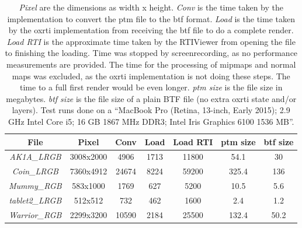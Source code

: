 \begin{table}[H]
\begin{tabular}{|c | c c c c c c|}
 \hline
 File & Pixel & Conv & Load & Load RTI &
 ptm size & btf size\\
  \hline
  \emph{AK1A\_LRGB} & 3008x2000 & 4906 & 1713 & 11800 & 54.1 & 30  \\
  \emph{Coin\_LRGB} & 7360x4912 & 24674 & 8224 & 59200 & 325.4 & 136  \\
  \emph{Mummy\_RGB} & 583x1000 & 1769 & 627 & 5200 & 10.5 & 5.6  \\
  \emph{tablet2\_LRGB} & 512x512 & 732 & 462 & 1600 & 2.4 & 1.2  \\
  \emph{Warrior\_RGB} & 2299x3200 & 10590 & 2184 & 25500 & 132.4 & 50.2  \\
 \hline
\end{tabular}
\caption[Performance Comparison]{\emph{Pixel} are the dimensions as width x height. \emph{Conv} is the time taken
by the implementation to convert the ptm file to the btf format. \emph{Load} is
the time taken by the oxrti implementation from receiving the btf file to do a complete render. \emph{Load
  RTI} is the approximate time taken by the RTIViewer from opening the file to
finishing the loading. Time was stopped by screenrecording, as no performance
measurements are provided. The time for the processing of mipmaps and normal
maps was excluded, as the oxrti implementation is not doing these steps. The
time to a full first render would be even longer. \emph{ptm size} is the file size in
megabytes. \emph{btf size} is the file size of a plain BTF file (no extra oxrti
state and/or layers). Test runs done on a ``MacBook Pro (Retina, 13-inch, Early
2015); 2.9 GHz Intel Core i5; 16 GB 1867 MHz DDR3; Intel Iris Graphics 6100 1536 MB''. }
\label{table_fileformat_results}
\end{table}

